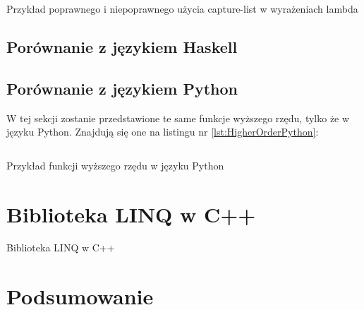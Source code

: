 \documentclass{pracamgr}
\begin{document}
\begin{listing}[H]
\inputminted[mathescape, linenos, numbersep=5pt, bgcolor=bg, rulecolor=\color{darkgray}, frame=lines, framesep=2mm]{cpp}{../SEM1/fun.cpp}
\caption{Przykład poprawnego i niepoprawnego użycia capture-list w wyrażeniach lambda}
\label{lst:HigherOrderCPP}
\end{listing}



\section{Porównanie z językiem Haskell}
\section{Porównanie z językiem Python}

W tej sekcji zostanie przedstawione te same funkcje wyższego rzędu, tylko że w języku Python. 
Znajdują się one na listingu nr \ref{lst:HigherOrderPython}:
 
\begin{listing}[H]
\inputminted[mathescape, linenos, numbersep=5pt, bgcolor=bg, rulecolor=\color{darkgray}, frame=lines, framesep=2mm]{python}{../SEM1/fun.py}
\caption{Przykład funkcji wyższego rzędu w języku Python}
\label{lst:HigherOrderPython}
\end{listing}









\chapter{Biblioteka LINQ w C++}\label{r:Biblioteka}

Biblioteka LINQ w C++


\chapter{Podsumowanie}



\listoffigures
\listoftables
\end{document}
